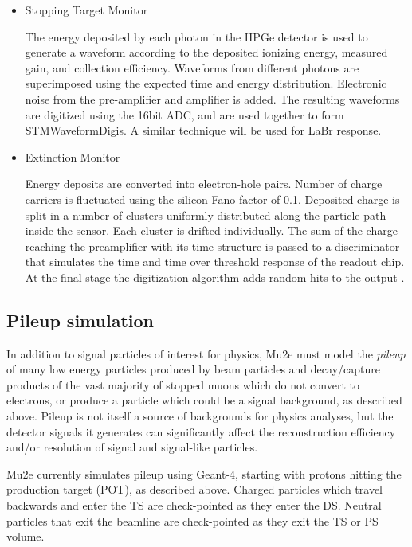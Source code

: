 \begin{itemize}
\item{Stopping Target Monitor}

The energy deposited by each photon in the HPGe detector is used to generate a waveform according to the deposited ionizing energy, measured gain, and collection efficiency. Waveforms from different photons are superimposed using the expected time and energy distribution. Electronic noise from the pre-amplifier and amplifier is added. The resulting waveforms are digitized using the 16bit ADC, and are used together to form STMWaveformDigis. A similar technique will be used for LaBr response.

\item{Extinction Monitor}

Energy deposits are converted into electron-hole pairs. Number of charge carriers is fluctuated 
using the silicon Fano factor of 0.1. Deposited charge is split in a number of clusters uniformly distributed along the particle path inside the sensor. Each cluster is drifted individually. The sum of the charge reaching the preamplifier with its time structure is passed to a discriminator that simulates the time and time over threshold response of the readout chip. At the final stage the digitization algorithm adds random hits to the output \cite{ExtMon:2014}.

\end{itemize}

\subsection{ Pileup simulation}
In addition to signal particles of interest for physics, Mu2e must model the \emph{pileup} of many low energy particles produced by beam particles and decay/capture products of the vast majority of stopped muons which do not convert to electrons, or produce a particle which could be a signal background, as described above. 
Pileup is not itself a source of backgrounds for physics analyses, but the detector signals it generates can significantly affect the reconstruction efficiency and/or resolution of signal and signal-like particles.

Mu2e currently simulates pileup using Geant-4, starting with protons hitting the production target (POT), as described above. Charged particles which travel backwards and enter the TS are check-pointed as they enter the DS. Neutral particles that exit the beamline are check-pointed as they exit the TS or PS volume.


